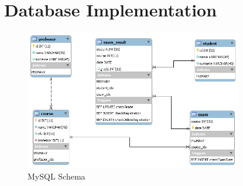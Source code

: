 \documentclass{report}
\begin{document}
\section*{Database Implementation}
\begin{figure}[ht]
	\includegraphics[width=0.85\textwidth]{mysqlSchema.png}
	\caption{MySQL Schema}
\end{figure}


\end{document}
